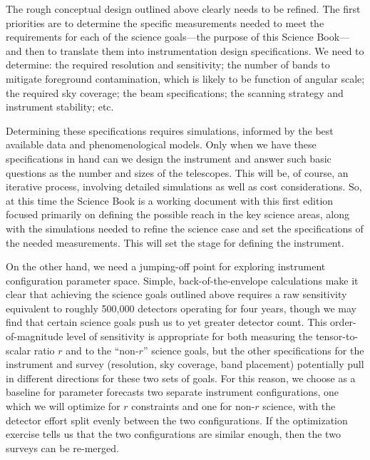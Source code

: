 The rough conceptual design outlined above clearly needs to be refined.  The first priorities are to determine the specific measurements needed to meet the requirements for each of the science goals---the purpose of this Science Book---and then to translate them into instrumentation design specifications. We need to determine:  the required resolution and sensitivity; the number of bands to mitigate foreground contamination, which is likely to be function of angular scale; the required sky coverage; the beam specifications; the scanning strategy and instrument stability; etc. 

Determining these specifications requires simulations, informed by the best available data and phenomenological models.  Only when we have these specifications in hand can we design the instrument and answer such basic questions as the number and sizes of the telescopes.  This will be, of course, an iterative process, involving detailed simulations as well as cost considerations. So, at this time the Science Book is a working document with this first edition focused primarily on defining the possible reach in the  key science areas, along with the simulations needed to refine the science case and set the specifications of the needed measurements. This will set the stage for defining the instrument.



On the other hand, we need a jumping-off point for exploring instrument configuration parameter space.  
Simple, back-of-the-envelope calculations make it clear that achieving the science goals outlined above requires a raw sensitivity equivalent to roughly 500,000 detectors operating for four years, though we may find that certain science goals push us to yet greater detector count. This order-of-magnitude level of sensitivity is appropriate for both measuring the tensor-to-scalar ratio $r$ and to the ``non-$r$'' science goals, but the other specifications for the instrument and survey (resolution, sky coverage, band placement) potentially pull in different directions for these two sets of goals. For this reason, we choose as a baseline for parameter forecasts two separate instrument configurations, one which we will optimize for $r$ constraints and one for non-$r$ science, with the detector effort split evenly between the two configurations. If the optimization exercise tells us that the two configurations are similar enough, then the two surveys can be re-merged. 

